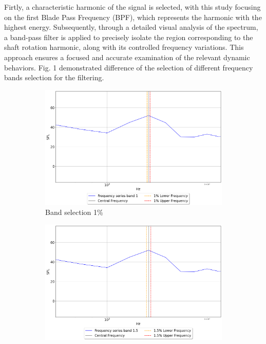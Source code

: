 \documentclass[10pt,fleqn,a4paper,twoside]{article}
\begin{document}
Firtly, a characteristic harmonic of the signal is selected, with this study focusing on the first Blade Pass Frequency (BPF), which represents the harmonic with the highest energy. Subsequently, through a detailed visual analysis of the spectrum, a band-pass filter is applied to precisely isolate the region corresponding to the shaft rotation harmonic, along with its controlled frequency variations. This approach ensures a focused and accurate examination of the relevant dynamic behaviors. Fig. 1 demonstrated difference of the selection of different frequency bands selection for the filtering.
\begin{figure}
    \centering
    \begin{subfigure}{0.4\textwidth}
        \includegraphics[width=\textwidth]{Figures/spectra_band_1.png}
        \caption{Band selection 1\%}
        \label{fig:first}
    \end{subfigure}
    \hfill
    \centering
    \begin{subfigure}{0.4\textwidth}
        \includegraphics[width=\textwidth]{Figures/spectra_band_1.5.png}

\end{subfigure}
\end{figure}
\end{document}
